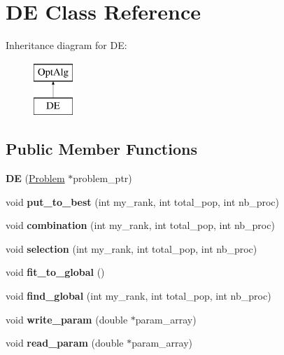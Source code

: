 \hypertarget{classDE}{}\section{D\+E Class Reference}
\label{classDE}
Inheritance diagram for D\+E\+:\begin{figure}[H]
\begin{center}
\leavevmode
\includegraphics[height=2.000000cm]{classDE}
\end{center}
\end{figure}
\subsection*{Public Member Functions}
\begin{DoxyCompactItemize}
\item 
\hypertarget{classDE_a1f05cc6409494dee6f1a51f3b8fffb33}{}{\bfseries D\+E} (\hyperlink{classProblem}{Problem} $\ast$problem\+\_\+ptr)\label{classDE_a1f05cc6409494dee6f1a51f3b8fffb33}

\item 
\hypertarget{classDE_a2ff7cab053965600e264c8aaa20a5e98}{}void {\bfseries put\+\_\+to\+\_\+best} (int my\+\_\+rank, int total\+\_\+pop, int nb\+\_\+proc)\label{classDE_a2ff7cab053965600e264c8aaa20a5e98}

\item 
\hypertarget{classDE_a75bbf1f66249014230af0c36b1692da6}{}void {\bfseries combination} (int my\+\_\+rank, int total\+\_\+pop, int nb\+\_\+proc)\label{classDE_a75bbf1f66249014230af0c36b1692da6}

\item 
\hypertarget{classDE_aa7db64e161c9c0a8faa18fe54319f723}{}void {\bfseries selection} (int my\+\_\+rank, int total\+\_\+pop, int nb\+\_\+proc)\label{classDE_aa7db64e161c9c0a8faa18fe54319f723}

\item 
\hypertarget{classDE_a92e6613371643726878322829ce006e9}{}void {\bfseries fit\+\_\+to\+\_\+global} ()\label{classDE_a92e6613371643726878322829ce006e9}

\item 
\hypertarget{classDE_a2975856172cbfa1512919986dcf5a87f}{}void {\bfseries find\+\_\+global} (int my\+\_\+rank, int total\+\_\+pop, int nb\+\_\+proc)\label{classDE_a2975856172cbfa1512919986dcf5a87f}

\item 
\hypertarget{classDE_a07523caeeac589fc632a8aa87c8305dd}{}void {\bfseries write\+\_\+param} (double $\ast$param\+\_\+array)\label{classDE_a07523caeeac589fc632a8aa87c8305dd}

\item 
\hypertarget{classDE_a1ad5a8387091099c20f455ad30afb505}{}void {\bfseries read\+\_\+param} (double $\ast$param\+\_\+array)\label{classDE_a1ad5a8387091099c20f455ad30afb505}

\end{DoxyCompactItemize}
